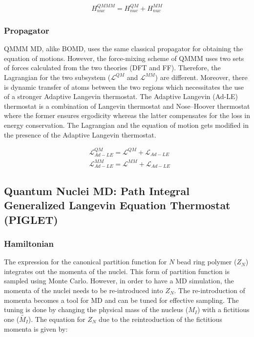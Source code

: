 \begin{align}
    \label{QMMM-MD}
    H_{nuc}^{QMMM}=H^{QM}_{nuc} + H^{MM}_{nuc}
\end{align}

\subsubsection{Propagator}

QMMM MD, alike BOMD, uses the same classical propagator for obtaining the equation of motions. However, the force-mixing scheme of QMMM  uses two sets of forces calculated from the two theories (DFT and FF). Therefore, the Lagrangian for the two subsystem ($\mathcal{L}^{QM}$ and $\mathcal{L}^{MM}$) are different. Moreover, there is dynamic transfer of atoms between the two regions which necessitates the use of a stronger Adaptive Langevin\cite{jones2011adaptive} thermostat. The Adaptive Langevin (Ad-LE) thermostat is a combination of Langevin thermostat  and Nose–Hoover thermostat where the former ensures ergodicity whereas the latter compensates for the loss in energy conservation. The Lagrangian and the equation of motion gets modified in the presence of the Adaptive Langevin thermostat.

\begin{align}
    \label{QMMM-1}
    &\mathcal{L}^{QM}_{Ad-LE}=\mathcal{L}^{QM}+\mathcal{L}_{Ad-LE}\\
    &\mathcal{L}^{MM}_{Ad-LE}=\mathcal{L}^{MM}+\mathcal{L}_{Ad-LE}
\end{align}




\subsection{Quantum Nuclei MD: Path Integral Generalized Langevin Equation Thermostat (PIGLET)}

\subsubsection{Hamiltonian}

The expression for the canonical partition function for $N$ bead ring polymer ($Z_N$) integrates out the momenta of the nuclei. This form of partition function is sampled using Monte Carlo. However, in order to have a MD simulation, the momenta of the nuclei needs to be re-introduced into $Z_{N}$. The re-introduction of momenta becomes a tool for MD and can be tuned for effective  sampling. The tuning is done by changing the physical mass of the nucleus ($M_I$) with a fictitious one ($\tilde{M_I}$). The equation for $Z_N$ due to the reintroduction of the fictitious momenta is given by:


